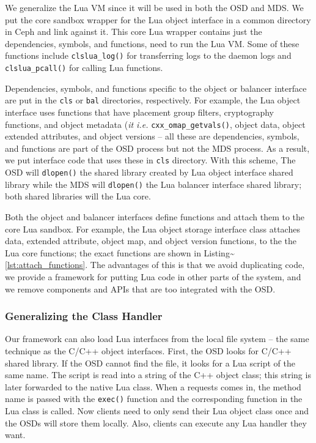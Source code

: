 \documentclass[10pt,twocolumn]{article}
\begin{document}
We generalize the Lua VM since it will be used in both the OSD and MDS.
We put the core sandbox wrapper for the Lua object interface in a common
directory in Ceph and link against it. This core Lua wrapper contains
just the dependencies, symbols, and functions, need to run the Lua VM.
Some of these functions include \texttt{clslua\_log()} for transferring
logs to the daemon logs and \texttt{clslua\_pcall()} for calling Lua
functions.

Dependencies, symbols, and functions specific to the object or balancer
interface are put in the \texttt{cls} or \texttt{bal} directories,
respectively. For example, the Lua object interface uses functions that
have placement group filters, cryptography functions, and object
metadata (\emph{it i.e.} \texttt{cxx\_omap\_getvals()}, object data,
object extended attributes, and object versions -- all these are
dependencies, symbols, and functions are part of the OSD process but not
the MDS process. As a result, we put interface code that uses these in
\texttt{cls} directory. With this scheme, The OSD will \texttt{dlopen()}
the shared library created by Lua object interface shared library while
the MDS will \texttt{dlopen()} the Lua balancer interface shared
library; both shared libraries will the Lua core.

Both the object and balancer interfaces define functions and attach them
to the core Lua sandbox. For example, the Lua object storage interface
class attaches data, extended attribute, object map, and object version
functions, to the the Lua core functions; the exact functions are shown
in Listing\textasciitilde{}\ref{lst:attach_functions}. The advantages of
this is that we avoid duplicating code, we provide a framework for
putting Lua code in other parts of the system, and we remove components
and APIs that are too integrated with the OSD.

\subsubsection{Generalizing the Class
Handler}\label{generalizing-the-class-handler}

Our framework can also load Lua interfaces from the local file system --
the same technique as the C/C++ object interfaces. First, the OSD looks
for C/C++ shared library. If the OSD cannot find the file, it looks for
a Lua script of the same name. The script is read into a string of the
C++ object class; this string is later forwarded to the native Lua
class. When a requests comes in, the method name is passed with the
\texttt{exec()} function and the corresponding function in the Lua class
is called. Now clients need to only send their Lua object class once and
the OSDs will store them locally. Also, clients can execute any Lua
handler they want.
\end{document}
